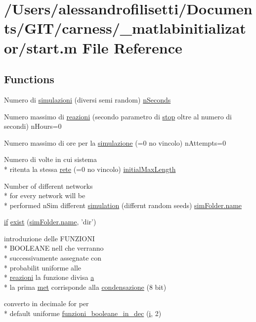 \hypertarget{a00113}{\section{/\-Users/alessandrofilisetti/\-Documents/\-G\-I\-T/carness/\-\_\-matlabinitializator/start.m File Reference}
\label{a00113}
}
\subsection*{Functions}
\begin{DoxyCompactItemize}
\item 
Numero di \hyperlink{a00113_a1b273eb41d82b5ca6c9f74a3c0aa2855}{simulazioni} (diversi semi random) \hyperlink{a00112_aaded2f2d61413dc4bddf805e9be03ded}{n\-Seconds}
\item 
Numero massimo di \hyperlink{a00113_a69962f56e60d0c88abc5d4b6839c2886}{reazioni} (secondo parametro di \hyperlink{a00030_a6bd08e37edf4151f5f6d1fc27a6f227a}{stop} oltre al numero di secondi) n\-Hours=0
\item 
Numero massimo di ore per la \hyperlink{a00113_ad4ff287bf077be8ffb479fcc197bc548}{simulazione} (=0 no vincolo) n\-Attempts=0
\item 
Numero di volte in cui sistema \\*
ritenta la stessa \hyperlink{a00113_a40d2922f55b48d94c99038a8c2bef2ff}{rete} (=0 no vincolo) \hyperlink{a00112_a4c7433c24b6426a15069cc5a93a5cbec}{initial\-Max\-Length}
\item 
Number of different networks \\*
for every network will be \\*
performed n\-Sim different \hyperlink{a00113_a096e1441156fd2c744baece86d6b295c}{simulation} (differnt random seeds) \hyperlink{a00027_abbf559a76fab59203496b0847ab9502a}{sim\-Folder.\-name}
\item 
\hyperlink{a00030_a01d55766b8058903dd360b4bda71f9f5}{if} \hyperlink{a00113_acda334cb7ae2a2f83fa0ec9c6f57a846}{exist} (\hyperlink{a00027_abbf559a76fab59203496b0847ab9502a}{sim\-Folder.\-name}, 'dir')
\item 
introduzione delle F\-U\-N\-Z\-I\-O\-N\-I \\*
B\-O\-O\-L\-E\-A\-N\-E nell che verranno \\*
successivamente assegnate con \\*
probabilit uniforme alle \\*
\hyperlink{a00113_a69962f56e60d0c88abc5d4b6839c2886}{reazioni} la funzione divisa \hyperlink{a00035_a2ffdbad9ea59541e59cbd2b938e0770c}{a} \\*
la prima \hyperlink{a00113_a53f2a5c181e46a513a4e87f144d19f6b}{met} corrisponde alla \hyperlink{a00113_a8c8df28fc47986989fead7fb4ee1a3ea}{condensazione} (8 bit)
\item 
converto in decimale for per \\*
default uniforme \hyperlink{a00113_aca80ac3e93dabd95e623a51f90fb37b6}{funzioni\-\_\-booleane\-\_\-in\-\_\-dec} (\hyperlink{a00113_ad3efca1ea6e3333daf30719ee0501862}{i}, 2)
\end{DoxyCompactItemize}
